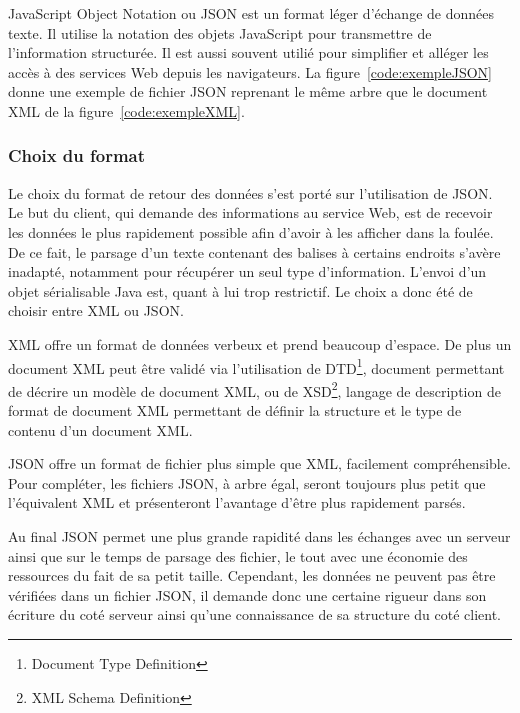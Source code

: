 JavaScript Object Notation ou JSON est un format l\'eger d'\'echange de donn\'ees texte.
Il utilise la notation des objets JavaScript pour transmettre de l'information structur\'ee.
Il est aussi souvent utili\'e pour simplifier et all\'eger les acc\`es \`a des services Web depuis les navigateurs.
La figure~\ref{code:exempleJSON} donne une exemple de fichier JSON reprenant le m\^eme arbre que le document XML de la figure~\ref{code:exempleXML}.

\vspace{0.20cm}


\label{code:exempleJSON}

\subsubsection{Choix du format}

Le choix du format de retour des donn\'ees s'est port\'e sur l'utilisation de JSON.
Le but du client, qui demande des informations au service Web, est de recevoir les donn\'ees le plus rapidement possible afin d'avoir \`a les afficher dans la foul\'ee.
De ce fait, le parsage d'un texte contenant des balises \`a certains endroits s'av\`ere inadapt\'e, notamment pour r\'ecup\'erer un seul type d'information.
L'envoi d'un objet s\'erialisable Java est, quant \`a lui trop restrictif. Le choix a donc \'et\'e de choisir entre XML ou JSON.

XML offre un format de donn\'ees verbeux et prend beaucoup d'espace. 
De plus un document XML peut \^etre valid\'e via l'utilisation de DTD\protect\footnote{Document Type Definition}, document permettant de d\'ecrire un mod\`ele de document XML, ou de XSD\protect\footnote{XML Schema Definition}, langage de description de format de document XML permettant de d\'efinir la structure et le type de contenu d'un document XML.

JSON offre un format de fichier plus simple que XML, facilement compr\'ehensible.
Pour compl\'eter, les fichiers JSON, \`a arbre \'egal, seront toujours plus petit que l'\'equivalent XML et pr\'esenteront l'avantage d'\^etre plus rapidement pars\'es.

Au final JSON permet une plus grande rapidit\'e dans les \'echanges avec un serveur ainsi que sur le temps de parsage des fichier, le tout avec une \'economie des ressources du fait de sa petit taille.
Cependant, les donn\'ees ne peuvent pas \^etre v\'erifi\'ees dans un fichier JSON, il demande donc une certaine rigueur dans son \'ecriture du cot\'e serveur ainsi qu'une connaissance de sa structure du cot\'e client.


